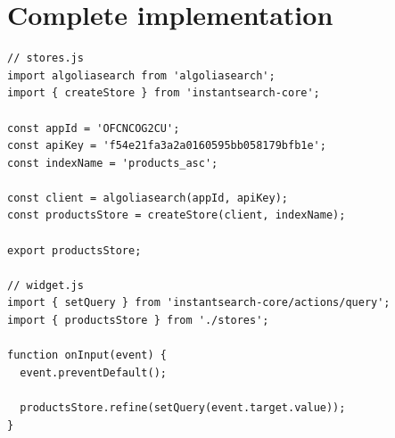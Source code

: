 \section{Complete implementation} %
\label{sec:complete_implementation}


\begin{lstlisting}[caption={Using instantearch-core},label={lst:is-core-usage}]
// stores.js
import algoliasearch from 'algoliasearch';
import { createStore } from 'instantsearch-core';

const appId = 'OFCNCOG2CU';
const apiKey = 'f54e21fa3a2a0160595bb058179bfb1e';
const indexName = 'products_asc';

const client = algoliasearch(appId, apiKey);
const productsStore = createStore(client, indexName);

export productsStore;

// widget.js
import { setQuery } from 'instantsearch-core/actions/query';
import { productsStore } from './stores';

function onInput(event) {
  event.preventDefault();

  productsStore.refine(setQuery(event.target.value));
}
\end{lstlisting}


